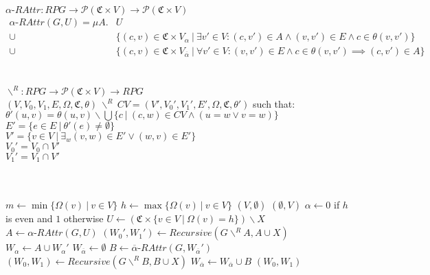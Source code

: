 \documentclass[]{article}
\begin{document}
$\alpha\textit{-RAttr} : \textit{RPG} \rightarrow \mathcal{P}(\mathfrak{C} \times V) \rightarrow \mathcal{P}(\mathfrak{C} \times V)$\\
\begin{align*}
\alpha\textit{-RAttr}(G, U) = \mu A . & U \\
 \cup &\{(c,v) \in \mathfrak{C} \times V_\alpha\ |\ \exists v' \in V : (c, v') \in A \wedge (v, v') \in E \wedge c \in \theta(v,v') \}\\
 \cup &\{(c,v) \in \mathfrak{C} \times V_{\overline{\alpha}}\ |\ \forall v' \in V : (v,v') \in E \wedge c \in \theta(v,v') \implies (c, v') \in A \}
\end{align*}\\\\

$\backslash^{\!\!R} : \textit{RPG} \rightarrow \mathcal{P}(\mathfrak{C} \times V) \rightarrow \textit{RPG}$\\
$(V, V_0, V_1, E, \Omega, \mathfrak{C}, \theta)\ \backslash^{\!\!R}\ CV = (V', V_0', V_1', E', \Omega, \mathfrak{C}, \theta')$ such that:\\
$\theta'(u,v) = \theta(u,v) \backslash \bigcup\{c\ |\ (c,w) \in CV \wedge (u = w \vee v = w)\}$\\
$E' = \{e \in E\ |\ \theta'(e) \neq \emptyset \}$\\
$V' = \{v \in V\ |\ \exists_w (v,w) \in E' \vee (w,v) \in E' \}$\\
$V_0' = V_0 \cap V'$\\
$V_1' = V_1 \cap V'$\\\\\\
\begin{algorithm}
	\caption{$\textsc{RecursiveRPG}(\textit{RPG } G = (V,V_0,V_1, E, \Omega, \mathfrak{C}, \theta)$, $X \subseteq \mathfrak{C} \times V$}
\begin{algorithmic}[1]
	\State $m \gets \min\{ \Omega(v)\ |\ v \in V\}$
	\State $h \gets\max\{ \Omega(v)\ |\ v \in V\}$
			\State \Return $(V,\emptyset)$
		\Else
			\State \Return $(\emptyset, V)$
		\EndIf
	\EndIf
	\State $\alpha \gets 0$ if $h$ is even and $1$ otherwise
	\State $U \gets (\mathfrak{C} \times \{v \in V\ |\ \Omega(v) = h\}) \backslash X$
	\State $A \gets \alpha\textit{-RAttr}(G, U)$
	\State $(W_0', W_1') \gets \textit{Recursive}(G \backslash^{\!\!R} A ,A \cup X)$
		\State $W_\alpha \gets A \cup W_\alpha'$
		\State $W_{\overline{\alpha}} \gets \emptyset$
	\Else
		\State $B \gets \overline{\alpha}\textit{-RAttr}(G,W_{\overline{\alpha}}')$
		\State $(W_0, W_1) \gets \textit{Recursive}(G \backslash^{\!\!R} B,B \cup X)$
		\State $W_{\overline{\alpha}} \gets W_{\overline{\alpha}} \cup B$
	\EndIf
	\State \Return $(W_0, W_1)$
\end{algorithmic}
\end{algorithm}
\end{document}
